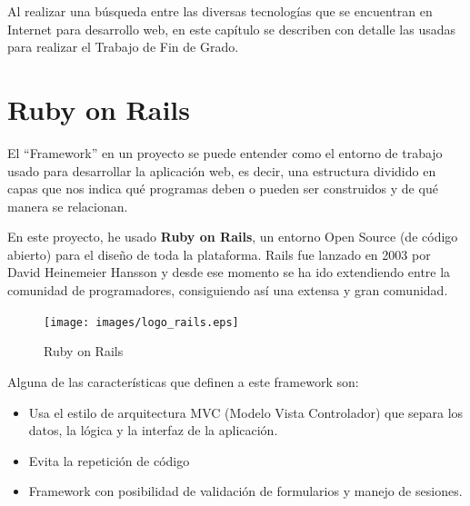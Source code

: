 
Al realizar una búsqueda entre las diversas tecnologías que se encuentran en Internet para desarrollo web, en este capítulo se describen con detalle las usadas para realizar el Trabajo de Fin de Grado.


\section{Ruby on Rails}
\label{3:sec:1}

El ``Framework'' en un proyecto se puede entender como el entorno de trabajo usado para desarrollar la aplicación web, es decir, una estructura dividido en capas que nos indica qué programas deben o pueden ser construidos y de qué manera se relacionan.

En este proyecto, he usado \textbf{Ruby on Rails}\cite{Rails}, un entorno Open Source (de código abierto) para el diseño de toda la plataforma. Rails fue lanzado en 2003 por David Heinemeier Hansson y desde ese momento se ha ido extendiendo entre la comunidad de programadores, consiguiendo así una extensa y gran comunidad.

\begin{figure}[!th]
\begin{center}
\texttt{[image: images/logo\_rails.eps]}
\caption{Ruby on Rails}
\label{fig:4}
\end{center}
\end{figure}

Alguna de las características que definen a este framework son:

\begin{itemize}
    \item Usa el estilo de arquitectura MVC (Modelo Vista Controlador) que separa los datos, la lógica y la interfaz de la aplicación.
    \item Evita la repetición de código
    \item Framework con posibilidad de validación de formularios y manejo de sesiones.
\end{itemize}


